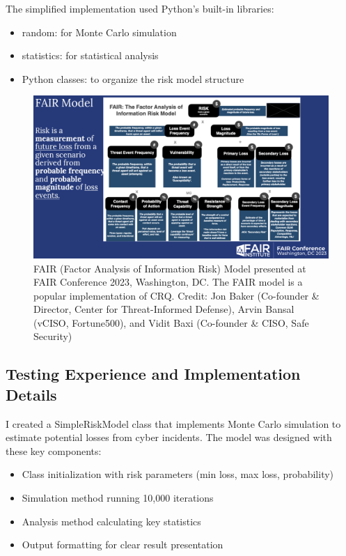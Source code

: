 \documentclass{article}
\begin{document}
The simplified implementation used Python's built-in libraries:
\begin{itemize}
    \item random: for Monte Carlo simulation
    \item statistics: for statistical analysis
    \item Python classes: to organize the risk model structure
\end{itemize}

\begin{figure}[h]
    \centering
    \includegraphics[width=\textwidth]{images/fair_model.png}
    \caption{FAIR (Factor Analysis of Information Risk) Model presented at FAIR Conference 2023, Washington, DC. The FAIR model is a popular implementation of CRQ.
    Credit: Jon Baker (Co-founder \& Director, Center for Threat-Informed Defense), 
    Arvin Bansal (vCISO, Fortune500), and Vidit Baxi (Co-founder \& CISO, Safe Security)}
    \label{fig:fair-model}
\end{figure}

\subsection{Testing Experience and Implementation Details}
I created a SimpleRiskModel class that implements Monte Carlo simulation to estimate 
potential losses from cyber incidents. The model was designed with these key components:
\begin{itemize}
    \item Class initialization with risk parameters (min loss, max loss, probability)
    \item Simulation method running 10,000 iterations
    \item Analysis method calculating key statistics
    \item Output formatting for clear result presentation
\end{itemize}
\end{document}
